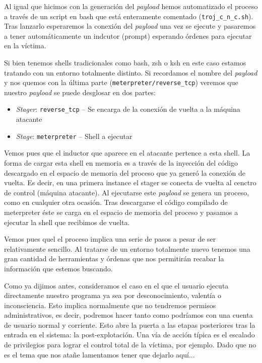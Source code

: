 \documentclass[12pt]{article}
\newcommand{\newpar} {
    \vskip 1cm
}
\begin{document}
                \newpar

                Al igual que hicimos con la generación del \textit{payload} hemos automatizado el proceso a través de un script en bash que está enteramente comentado (\texttt{troj_c_n_c.sh}). Tras lanzarlo esperaremos la conexión del \textit{payload} una vez se ejecute y pasaremos a tener automáticamente un indcutor (prompt) esperando órdenes para ejecutar en la víctima.

                \newpar

                Si bien tenemos shells tradicionales como bash, zsh o ksh en este caso estamos tratando con un entorno totalmente distinto. Si recordamos el nombre del \textit{payload} y nos quemos con la última parte (\texttt{meterpreter/reverse_tcp}) veremos que nuestro \textit{payload} se puede desglosar en dos partes:

                \begin{itemize}
                    \item \textit{Stager}: \texttt{reverse_tcp} -- Se encarga de la conexión de vuelta a la máquina atacante
                    \item \textit{Stage}: \texttt{meterpreter} -- Shell a ejecutar
                \end{itemize}

                Vemos pues que el inductor que aparece en el atacante pertence a esta shell. La forma de cargar esta shell en memoria es a través de la inyección del código descargado en el espacio de memoria del proceso que ya generó la conexión de vuelta. Es decir, en una primera instance el stager se conecta de vuelta al cenctro de control (máquina atacante). Al ejecutarse este \textit{payload} se genera un proceso, como en cualquier otra ocasión. Tras descargarse el código compilado de meterpreter éste se carga en el espacio de memoria del proceso y pasamos a ejecutar la shell que recibimos de vuelta.

                \newpar

                Vemos pues quel el proceso implica una serie de pasos a pesar de ser relativamente sencillo. Al tratarse de un entorno totalmente nuevo tenemos una gran cantidad de herramientas y órdenas que nos permitirán recabar la información que estemos buscando.

                \newpar

                Como ya dijimos antes, consideramos el caso en el que el usuario ejecuta directamente nuestro programa ya sea por desconocimiento, valentía o inconsciencia. Esto implica normalmente que no tendremos permisos administrativos, es decir, podremos hacer tanto como podríamos con una cuenta de usuario normal y corriente. Esto abre la puerta a las etapas posteriores tras la entrada en el sistema: la post-explotación. Una vía de acción típica es el escalado de privilegios para lograr el control total de la víctima, por ejemplo. Dado que no es el tema que nos atañe lamentamos tener que dejarlo aquí...
\end{document}

